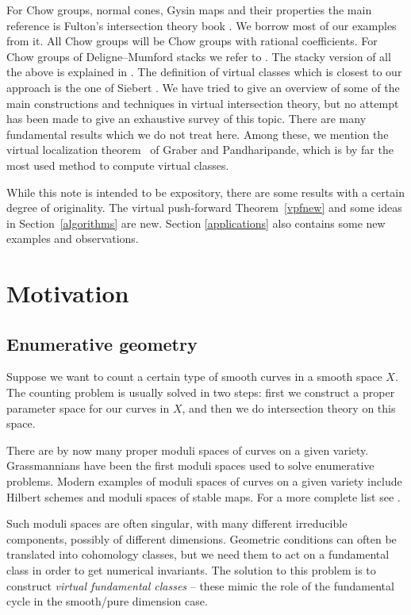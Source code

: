 \documentclass[pdftex]{sigma}
\numberwithin{equation}{section}
\begin{document}
For Chow groups, normal cones, Gysin maps and their properties the main reference is Fulton's intersection theory book \cite{Fulton}. We borrow most of our examples from it. All Chow groups will be Chow groups with rational coefficients. For Chow groups of Deligne--Mumford stacks we refer to \cite{vis}. The stacky version of all the above is explained in \cite{BerFan}. The definition of virtual classes which is closest to our approach is the one of Siebert \cite{siebert}. We have tried to give an overview of some of the main constructions and techniques in virtual intersection theory, but no attempt has been made to give an exhaustive survey of this topic. There are many fundamental results which we do not treat here. Among these, we mention the virtual localization theorem~\cite{grpa} of Graber and Pandharipande, which is by far the most used method to compute virtual classes.

While this note is intended to be expository, there are some results with a certain degree of originality. The virtual push-forward Theorem~\ref{vpfnew} and some ideas in Section~\ref{algorithms} are new. Section \ref{applications} also contains some new examples and observations.

\section{Motivation}

\subsection{Enumerative geometry} Suppose we want to count a certain type of smooth curves in a smooth space $X$. The counting problem is usually solved in two steps: first we construct a proper parameter space for our curves in $X$, and then we do intersection theory on this space.

There are by now many proper moduli spaces of curves on a given variety. Grassmannians have been the first moduli spaces used to solve enumerative problems. Modern examples of moduli spaces of curves on a given variety include Hilbert schemes and moduli spaces of stable maps. For a more complete list see \cite{rt}.

Such moduli spaces are often singular, with many different irreducible components, possibly of different dimensions. Geometric conditions can often be translated into cohomology classes, but we need them to act on a fundamental class in order to get numerical invariants. The solution to this problem is to construct \emph{virtual fundamental classes} -- these mimic the role of the fundamental cycle in the smooth/pure dimension case.
\end{document}
